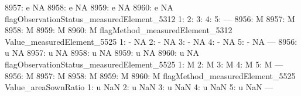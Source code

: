 \documentclass[nojss]{jss}
\begin{document}
\begin{Schunk}
\begin{Soutput}
8957:                               e                         NA
8958:                               e                         NA
8959:                               e                         NA
8960:                               e                         NA
      flagObservationStatus_measuredElement_5312
   1:                                           
   2:                                           
   3:                                           
   4:                                           
   5:                                           
  ---                                           
8956:                                          M
8957:                                          M
8958:                                          M
8959:                                          M
8960:                                          M
      flagMethod_measuredElement_5312 Value_measuredElement_5525
   1:                               -                         NA
   2:                               -                         NA
   3:                               -                         NA
   4:                               -                         NA
   5:                               -                         NA
  ---                                                           
8956:                               u                         NA
8957:                               u                         NA
8958:                               u                         NA
8959:                               u                         NA
8960:                               u                         NA
      flagObservationStatus_measuredElement_5525
   1:                                          M
   2:                                          M
   3:                                          M
   4:                                          M
   5:                                          M
  ---                                           
8956:                                          M
8957:                                          M
8958:                                          M
8959:                                          M
8960:                                          M
      flagMethod_measuredElement_5525 Value_areaSownRatio
   1:                               u                 NaN
   2:                               u                 NaN
   3:                               u                 NaN
   4:                               u                 NaN
   5:                               u                 NaN
  ---                                                    

\end{Soutput}
\end{Schunk}
\end{document}
